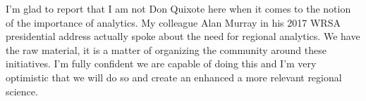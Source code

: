 \documentclass[11pt]{article}
\begin{document}
I'm glad to report that I am not Don Quixote here when it comes to the notion
of the importance of analytics. My colleague Alan Murray in his 2017 WRSA
presidential address \citep{Murray_2017_ars} actually spoke about the need for
regional analytics. We have the raw material, it is a matter of organizing the
community around these initiatives. I'm fully confident we are capable of doing
this and I'm very optimistic that we will do so and create an enhanced a
more relevant regional science.



\end{document}
